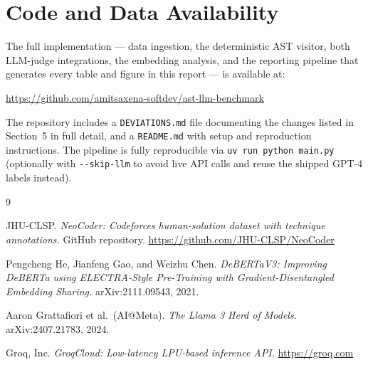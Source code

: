 \documentclass{article}
\begin{document}
\section{Code and Data Availability}

The full implementation --- data ingestion, the deterministic AST visitor,
both LLM-judge integrations, the embedding analysis, and the reporting
pipeline that generates every table and figure in this report --- is
available at:

\begin{center}
\url{https://github.com/amitsaxena-softdev/ast-llm-benchmark}
\end{center}

The repository includes a \texttt{DEVIATIONS.md} file documenting the changes
listed in Section~5 in full detail, and a \texttt{README.md} with setup and
reproduction instructions. The pipeline is fully reproducible via
\texttt{uv run python main.py} (optionally with \texttt{-{}-skip-llm} to avoid
live API calls and reuse the shipped GPT-4 labels instead).


{
\small

\begin{thebibliography}{9}

JHU-CLSP.
\textit{NeoCoder: Codeforces human-solution dataset with technique
annotations.}
GitHub repository.
\url{https://github.com/JHU-CLSP/NeoCoder}

Pengcheng He, Jianfeng Gao, and Weizhu Chen.
\textit{DeBERTaV3: Improving DeBERTa using ELECTRA-Style Pre-Training with
Gradient-Disentangled Embedding Sharing.}
arXiv:2111.09543, 2021.

Aaron Grattafiori et al.\ (AI@Meta).
\textit{The Llama 3 Herd of Models.}
arXiv:2407.21783, 2024.

Groq, Inc.
\textit{GroqCloud: Low-latency LPU-based inference API.}
\url{https://groq.com}

\end{thebibliography}
}
\end{document}

